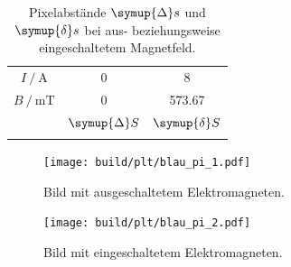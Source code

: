 \begin{table}
    \centering
    \caption{Pixelabstände $\symup{\Delta} s$ und $\symup{\delta} s$ bei aus- beziehungsweise eingeschaltetem Magnetfeld.}
    \label{tab:blau_pi}
    \begin{tabular}{S S S}
        \toprule
        {$I \mathbin{/} \si{\ampere}$} & 0 & 8 \\
        {$B \mathbin{/} \si{\milli\tesla}$} & 0 & 573.67  \\
        \midrule
        & {$\symup{\Delta} S$} & {$\symup{\delta} S$} \\
        \midrule
        \bottomrule
    \end{tabular}
\end{table}

\begin{figure}
    \centering
    \texttt{[image: build/plt/blau\_pi\_1.pdf]}
    \caption{Bild mit ausgeschaltetem Elektromagneten.}
    \label{fig:plt:blau_pi_1}
\end{figure}

\begin{figure}
    \centering
    \texttt{[image: build/plt/blau\_pi\_2.pdf]}
    \caption{Bild mit eingeschaltetem Elektromagneten.}
    \label{fig:plt:blau_pi_2}
\end{figure}
